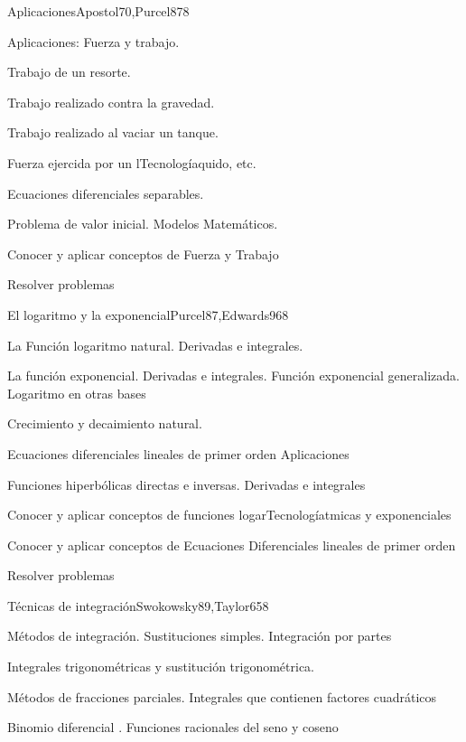 \begin{syllabus}
\begin{unit}{Aplicaciones}{Apostol70,Purcel87}{8}
\begin{topics}
      \item Aplicaciones: Fuerza y trabajo. 
      \item Trabajo de un resorte. 
      \item Trabajo realizado contra la gravedad. 
      \item Trabajo realizado al vaciar un tanque. 
      \item Fuerza ejercida por un lTecnologíaquido, etc.
      \item Ecuaciones diferenciales separables. 
      \item Problema de valor inicial. Modelos Matemáticos.
\end{topics}

\begin{unitgoals}
	\item Conocer y aplicar conceptos de Fuerza y Trabajo
	\item Resolver problemas
\end{unitgoals}
\end{unit}

\begin{unit}{El logaritmo y la exponencial}{Purcel87,Edwards96}{8}
\begin{topics}
	\item La Función logaritmo natural. Derivadas e integrales.
	\item La función exponencial. Derivadas e integrales. Función exponencial  generalizada. Logaritmo en otras bases
	\item Crecimiento y decaimiento natural. 
	\item Ecuaciones diferenciales lineales de primer orden Aplicaciones
	\item Funciones hiperbólicas directas e inversas. Derivadas e integrales
\end{topics}

\begin{unitgoals}
	\item Conocer y aplicar conceptos de funciones logarTecnologíatmicas y exponenciales
	\item Conocer y aplicar conceptos de Ecuaciones Diferenciales lineales de primer orden
	\item Resolver problemas
\end{unitgoals}
\end{unit}

\begin{unit}{Técnicas de integración}{Swokowsky89,Taylor65}{8}
\begin{topics}
	\item Métodos de integración. Sustituciones simples. Integración por partes
	\item Integrales trigonométricas y sustitución trigonométrica.
	\item Métodos de fracciones parciales. Integrales que contienen factores  cuadráticos
	\item Binomio diferencial . Funciones racionales del seno y coseno
\end{topics}


\end{unit}
\end{syllabus}
